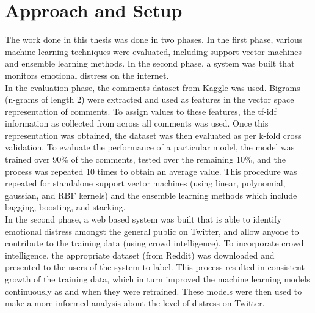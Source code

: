 \section{Approach and Setup}
The work done in this thesis was done in two phases. In the first phase, various machine learning techniques were evaluated, including support vector machines and ensemble learning methods. In the second phase, a system was built that monitors emotional distress on the internet.\\

In the evaluation phase, the comments dataset from Kaggle was used. Bigrams (n-grams of length 2) were extracted and used as features in the vector space representation of comments. To assign values to these features, the tf-idf information as collected from across all comments was used. Once this representation was obtained, the dataset was then evaluated as per k-fold cross validation. To evaluate the performance of a particular model, the model was trained over 90\% of the comments, tested over the remaining 10\%, and the process was repeated 10 times to obtain an average value. This procedure was repeated for standalone support vector machines (using linear, polynomial, gaussian, and RBF kernels) and the ensemble learning methods which include bagging, boosting, and stacking.\\

In the second phase, a web based system was built that is able to identify emotional distress amongst the general public on Twitter, and allow anyone to contribute to the training data (using crowd intelligence). To incorporate crowd intelligence, the appropriate dataset (from Reddit) was downloaded and presented to the users of the system to label. This process resulted in consistent growth of the training data, which in turn improved the machine learning models continuously as and when they were retrained. These models were then used to make a more informed analysis about the level of distress on Twitter.

